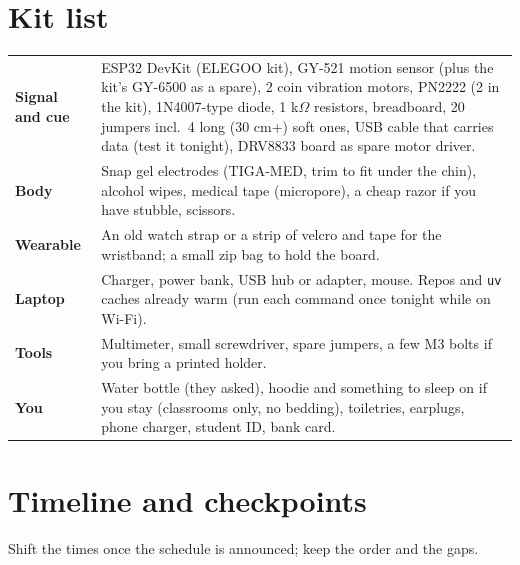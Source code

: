 \documentclass[10.5pt,a4paper]{article}
\newcommand{\f}[1]{\texttt{#1}}
\begin{document}
\section{Kit list}\label{sec:kit}
\begin{tabularx}{\linewidth}{@{}p{4.2cm}L@{}}
\toprule
\textbf{Signal and cue} & ESP32 DevKit (ELEGOO kit), GY-521 motion sensor (plus the kit's GY-6500 as a spare), 2 coin vibration motors, PN2222 (2 in the kit), 1N4007-type diode, 1 k\(\Omega\) resistors, breadboard, 20 jumpers incl.\ 4 long (30 cm+) soft ones, USB cable that carries data (test it tonight), DRV8833 board as spare motor driver.\\
\textbf{Body} & Snap gel electrodes (TIGA-MED, trim to fit under the chin), alcohol wipes, medical tape (micropore), a cheap razor if you have stubble, scissors.\\
\textbf{Wearable} & An old watch strap or a strip of velcro and tape for the wristband; a small zip bag to hold the board.\\
\textbf{Laptop} & Charger, power bank, USB hub or adapter, mouse. Repos and \f{uv} caches already warm (run each command once tonight while on Wi-Fi).\\
\textbf{Tools} & Multimeter, small screwdriver, spare jumpers, a few M3 bolts if you bring a printed holder.\\
\textbf{You} & Water bottle (they asked), hoodie and something to sleep on if you stay (classrooms only, no bedding), toiletries, earplugs, phone charger, student ID, bank card.\\
\bottomrule
\end{tabularx}

\section{Timeline and checkpoints}
Shift the times once the schedule is announced; keep the order and the gaps.
\end{document}
